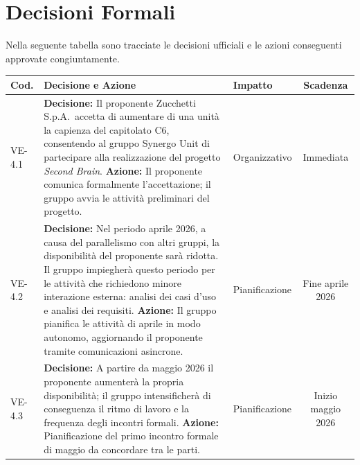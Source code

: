 \section{Decisioni Formali}
Nella seguente tabella sono tracciate le decisioni ufficiali e le azioni
conseguenti approvate congiuntamente.
 \renewcommand{\arraystretch}{1.5}
\begin{longtable}{p{1.2cm} p{7.5cm} p{2cm} c}
    \toprule
    \textbf{Cod.} & \textbf{Decisione e Azione}
        & \textbf{Impatto} & \textbf{Scadenza} \\
    \midrule
    \endhead

    VE-4.1
        & \textbf{Decisione:} Il proponente Zucchetti S.p.A.\ accetta di
          aumentare di una unità la capienza del capitolato C6, consentendo
          al gruppo Synergo Unit di partecipare alla realizzazione del progetto
          \textit{Second Brain}.
          \newline
          \textbf{Azione:} Il proponente comunica formalmente l'accettazione;
          il gruppo avvia le attività preliminari del progetto.
        & Organizzativo
        & Immediata \\[4pt]

    VE-4.2
        & \textbf{Decisione:} Nel periodo aprile 2026, a causa del parallelismo
          con altri gruppi, la disponibilità del proponente sarà ridotta. Il gruppo
          impiegherà questo periodo per le attività che richiedono minore
          interazione esterna: analisi dei casi d'uso e analisi dei requisiti.
          \newline
          \textbf{Azione:} Il gruppo pianifica le attività di aprile in modo
          autonomo, aggiornando il proponente tramite comunicazioni asincrone.
        & Pianificazione
        & Fine aprile 2026 \\[4pt]

    VE-4.3
        & \textbf{Decisione:} A partire da maggio 2026 il proponente aumenterà
          la propria disponibilità; il gruppo intensificherà di conseguenza
          il ritmo di lavoro e la frequenza degli incontri formali.
          \newline
          \textbf{Azione:} Pianificazione del primo incontro formale di
          maggio da concordare tra le parti.
        & Pianificazione
        & Inizio maggio 2026 \\

    \bottomrule
\end{longtable}

